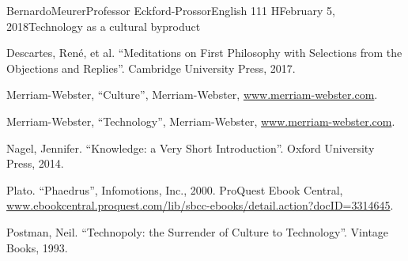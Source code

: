 \documentclass[12pt,letterpaper]{article}
\begin{document}
\begin{mla}{Bernardo}{Meurer}{Professor Eckford-Prossor}{English 111 H}{February 5, 2018}{Technology as a cultural byproduct}
\begin{workscited}
        \bibent Descartes, René, et al. ``Meditations on First Philosophy with Selections from the Objections and Replies''. Cambridge University Press, 2017.

        \bibent Merriam-Webster, “Culture”, Merriam-Webster, \url{www.merriam-webster.com}.

        \bibent Merriam-Webster, “Technology”, Merriam-Webster, \url{www.merriam-webster.com}.

        \bibent Nagel, Jennifer. ``Knowledge: a Very Short Introduction''. Oxford University Press, 2014.

        \bibent Plato. ``Phaedrus'', Infomotions, Inc., 2000. ProQuest Ebook Central, \url{www.ebookcentral.proquest.com/lib/sbcc-ebooks/detail.action?docID=3314645}.

        \bibent Postman, Neil. ``Technopoly: the Surrender of Culture to Technology''. Vintage Books, 1993.
    \end{workscited}
\end{mla}
\end{document}
